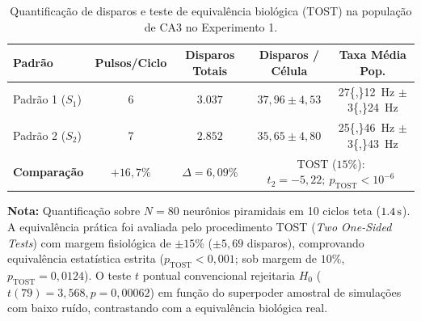 \begin{table}[tbp]
    \centering
    \small
    \setlength{\tabcolsep}{3.5pt}
    \caption{Quantificação de disparos e teste de equivalência biológica (TOST) na população de CA3 no Experimento 1.}
    \label{tab:resultados_exp1_disparos}
    \begin{tabular}{lcccc}
        \toprule
        \textbf{Padrão} & \textbf{Pulsos/Ciclo} & \textbf{Disparos Totais} & \textbf{Disparos / Célula} & \textbf{Taxa Média Pop.} \\
        \midrule
        Padrão 1 ($S_1$) & 6 & $3.037$ & $37{,}96 \pm 4{,}53$ & \qty{27{,}12}{\hertz} $\pm$ \qty{3{,}24}{\hertz} \\
        Padrão 2 ($S_2$) & 7 & $2.852$ & $35{,}65 \pm 4{,}80$ & \qty{25{,}46}{\hertz} $\pm$ \qty{3{,}43}{\hertz} \\
        \midrule
        \textbf{Comparação} & $+16{,}7\%$ & $\Delta = 6{,}09\%$ & \multicolumn{2}{c}{TOST ($15\%$): $t_2 = -5{,}22;\ p_{\text{TOST}} < 10^{-6}$} \\
        \bottomrule
    \end{tabular}
    \vspace{0.2em}
    \begin{minipage}{0.95\textwidth}
        \footnotesize \textbf{Nota:} Quantificação sobre $N=80$ neurônios piramidais em 10 ciclos teta ($\qty{1{,}4}{\second}$). A equivalência prática foi avaliada pelo procedimento TOST (\emph{Two One-Sided Tests}) com margem fisiológica de $\pm 15\%$ ($\pm 5{,}69$ disparos), comprovando equivalência estatística estrita ($p_{\text{TOST}} < 0{,}001$; sob margem de $10\%$, $p_{\text{TOST}} = 0{,}0124$). O teste $t$ pontual convencional rejeitaria $H_0$ ($t(79) = 3{,}568, p = 0{,}00062$) em função do superpoder amostral de simulações com baixo ruído, contrastando com a equivalência biológica real.
    \end{minipage}
\end{table}
